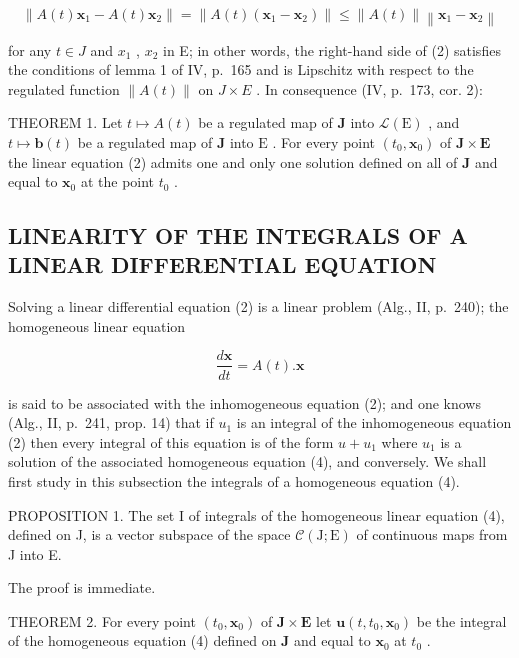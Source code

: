 \[
\left\| A (t) \mathbf {x} _ {1} - A (t) \mathbf {x} _ {2} \right\| = \left\| A (t) \left(\mathbf {x} _ {1} - \mathbf {x} _ {2}\right) \right\| \leqslant \left\| A (t) \right\| \left\| \mathbf {x} _ {1} - \mathbf {x} _ {2} \right\|
\]

for any \(t \in J\) and \(x_{1}\) , \(x_{2}\) in E; in other words, the right-hand side of (2) satisfies the conditions of lemma 1 of IV, p.~165 and is Lipschitz with respect to the regulated function \(\|A(t)\|\) on \(J \times E\) . In consequence (IV, p.~173, cor. 2):

THEOREM 1. Let \(t \mapsto A(t)\) be a regulated map of \(\mathbf{J}\) into \(\mathcal{L}(\mathrm{E})\) , and \(t \mapsto \mathbf{b}(t)\) be a regulated map of \(\mathbf{J}\) into \(\mathrm{E}\) . For every point \((t_0, \mathbf{x}_0)\) of \(\mathbf{J} \times \mathbf{E}\) the linear equation (2) admits one and only one solution defined on all of \(\mathbf{J}\) and equal to \(\mathbf{x}_0\) at the point \(t_0\) .

\subsection{LINEARITY OF THE INTEGRALS OF A LINEAR DIFFERENTIAL EQUATION}

Solving a linear differential equation (2) is a linear problem (Alg., II, p.~240); the homogeneous linear equation

\[
{\frac {d \mathbf {x}}{d t}} = A (t). \mathbf {x}\tag{4}
\]

is said to be associated with the inhomogeneous equation (2); and one knows (Alg., II, p.~241, prop. 14) that if \(u_{1}\) is an integral of the inhomogeneous equation (2) then every integral of this equation is of the form \(u + u_{1}\) where \(u_{1}\) is a solution of the associated homogeneous equation (4), and conversely. We shall first study in this subsection the integrals of a homogeneous equation (4).

PROPOSITION 1. The set I of integrals of the homogeneous linear equation (4), defined on J, is a vector subspace of the space \(\mathcal{C}(\mathrm{J};\mathrm{E})\) of continuous maps from J into E.

The proof is immediate.

THEOREM 2. For every point \((t_0, \mathbf{x}_0)\) of \(\mathbf{J} \times \mathbf{E}\) let \(\mathbf{u}(t, t_0, \mathbf{x}_0)\) be the integral of the homogeneous equation (4) defined on \(\mathbf{J}\) and equal to \(\mathbf{x}_0\) at \(t_0\) .

